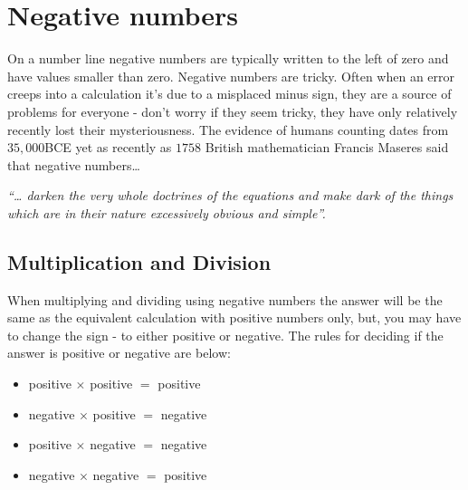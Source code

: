 \documentclass[
  a4paper,
]{scrbook}
\providecommand{\tightlist}{%
  \setlength{\itemsep}{0pt}\setlength{\parskip}{0pt}}
\begin{document}

\chapter{Negative numbers}\label{negative-numbers}

On a number line negative numbers are typically written to the left of
zero and have values smaller than zero. Negative numbers are tricky.
Often when an error creeps into a calculation it's due to a misplaced
minus sign, they are a source of problems for everyone - don't worry if
they seem tricky, they have only relatively recently lost their
mysteriousness. The evidence of humans counting dates from \(35,000\)BCE
yet as recently as \(1758\) British mathematician Francis Maseres said
that negative numbers\ldots{}

\emph{``\ldots{} darken the very whole doctrines of the equations and
make dark of the things which are in their nature excessively obvious
and simple''.}

\section{Multiplication and Division}\label{multiplication-and-division}

When multiplying and dividing using negative numbers the answer will be
the same as the equivalent calculation with positive numbers only, but,
you may have to change the sign - to either positive or negative. The
rules for deciding if the answer is positive or negative are below:

\begin{tcolorbox}[enhanced jigsaw, arc=.35mm, bottomrule=.15mm, bottomtitle=1mm, breakable, colback=white, colbacktitle=quarto-callout-note-color!10!white, colframe=quarto-callout-note-color-frame, coltitle=black, left=2mm, leftrule=.75mm, opacityback=0, opacitybacktitle=0.6, rightrule=.15mm, title=\textcolor{quarto-callout-note-color}{\faInfo}\hspace{0.5em}{Note}, titlerule=0mm, toprule=.15mm, toptitle=1mm]

\begin{itemize}
\tightlist
\item
  positive \(\times\) positive \(=\) positive
\item
  negative \(\times\) positive \(=\) negative
\item
  positive \(\times\) negative \(=\) negative
\item
  negative \(\times\) negative \(=\) positive
\end{itemize}

\end{tcolorbox}
\end{document}
